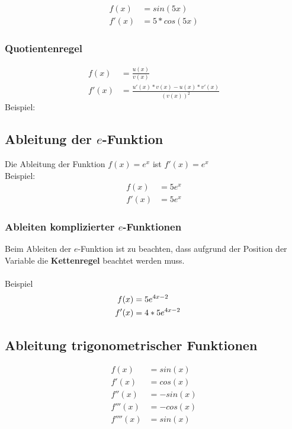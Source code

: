\documentclass[a4paper]{article} %
\begin{document}
		\begin{align*}
		f(x)&=sin(5x)\\
		f'(x)&=5*cos(5x)
		\end{align*}

	\subsubsection{Quotientenregel}
		\begin{align*}
		f(x)&=\frac{u(x)}{v(x)}\\
		f'(x)&=\frac{u'(x)*v(x)-u(x)*v'(x)}{(v(x))^2}
		\end{align*}
		Beispiel: \\ 
	
	\subsection{Ableitung der $e$-Funktion}
	Die Ableitung der Funktion $f(x)=e^x$ ist $f'(x)=e^x$
	\\Beispiel:\\
	\begin{align*}
		f(x)&=5e^x\\
		f'(x)&=5e^x
	\end{align*}
	\subsubsection{Ableiten komplizierter $e$-Funktionen}
	Beim Ableiten der $e$-Funktion ist zu beachten, dass aufgrund der Position der Variable die \textbf{Kettenregel}
	beachtet werden muss.\\\\
	Beispiel
	\\\begin{align*}
	f(x)&=5e^{4x-2}\\
	f'(x) &=4*5e^{4x-2} \hspace{0.5cm} 
	\end{align*} 
	\subsection{Ableitung trigonometrischer Funktionen}
	\begin{align*}
	f(x) &= sin(x)\\
	f'(x) &= cos(x)\\
	f''(x) &= -sin(x)\\
	f'''(x) &= -cos(x)\\
	f''''(x) &= sin(x)
 	\end{align*}
\end{document}
